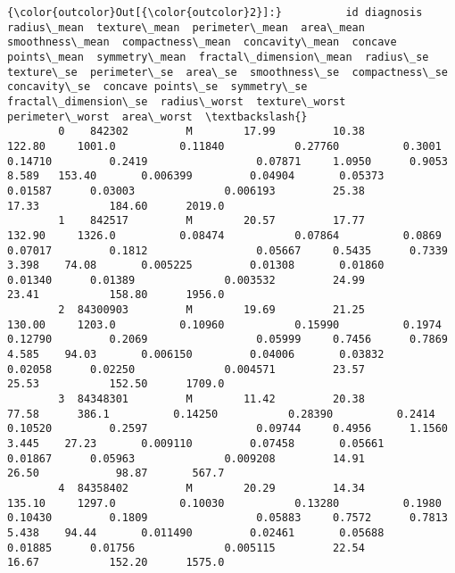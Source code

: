 \documentclass[11pt]{article}
\begin{document}
\begin{Verbatim}[commandchars=\\\{\}]
{\color{outcolor}Out[{\color{outcolor}2}]:}          id diagnosis  radius\_mean  texture\_mean  perimeter\_mean  area\_mean  smoothness\_mean  compactness\_mean  concavity\_mean  concave points\_mean  symmetry\_mean  fractal\_dimension\_mean  radius\_se  texture\_se  perimeter\_se  area\_se  smoothness\_se  compactness\_se  concavity\_se  concave points\_se  symmetry\_se  fractal\_dimension\_se  radius\_worst  texture\_worst  perimeter\_worst  area\_worst  \textbackslash{}
        0    842302         M        17.99         10.38          122.80     1001.0          0.11840           0.27760          0.3001              0.14710         0.2419                 0.07871     1.0950      0.9053         8.589   153.40       0.006399         0.04904       0.05373            0.01587      0.03003              0.006193         25.38          17.33           184.60      2019.0   
        1    842517         M        20.57         17.77          132.90     1326.0          0.08474           0.07864          0.0869              0.07017         0.1812                 0.05667     0.5435      0.7339         3.398    74.08       0.005225         0.01308       0.01860            0.01340      0.01389              0.003532         24.99          23.41           158.80      1956.0   
        2  84300903         M        19.69         21.25          130.00     1203.0          0.10960           0.15990          0.1974              0.12790         0.2069                 0.05999     0.7456      0.7869         4.585    94.03       0.006150         0.04006       0.03832            0.02058      0.02250              0.004571         23.57          25.53           152.50      1709.0   
        3  84348301         M        11.42         20.38           77.58      386.1          0.14250           0.28390          0.2414              0.10520         0.2597                 0.09744     0.4956      1.1560         3.445    27.23       0.009110         0.07458       0.05661            0.01867      0.05963              0.009208         14.91          26.50            98.87       567.7   
        4  84358402         M        20.29         14.34          135.10     1297.0          0.10030           0.13280          0.1980              0.10430         0.1809                 0.05883     0.7572      0.7813         5.438    94.44       0.011490         0.02461       0.05688            0.01885      0.01756              0.005115         22.54          16.67           152.20      1575.0   
        

\end{Verbatim}
\end{document}
